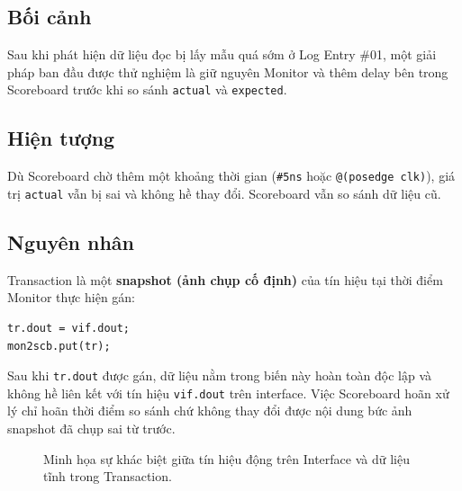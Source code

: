 \documentclass[12pt, a4paper]{article}
\begin{document}
\vspace{0.3cm}

\subsection*{Bối cảnh}
Sau khi phát hiện dữ liệu đọc bị lấy mẫu quá sớm ở Log Entry \#01, một giải pháp ban đầu được thử nghiệm là giữ nguyên Monitor và thêm delay bên trong Scoreboard trước khi so sánh \texttt{actual} và \texttt{expected}.

\subsection*{Hiện tượng}
Dù Scoreboard chờ thêm một khoảng thời gian (\texttt{\#5ns} hoặc \texttt{@(posedge clk)}), giá trị \texttt{actual} vẫn bị sai và không hề thay đổi. Scoreboard vẫn so sánh dữ liệu cũ.


\subsection*{Nguyên nhân}
Transaction là một \textbf{snapshot (ảnh chụp cố định)} của tín hiệu tại thời điểm Monitor thực hiện gán:
\begin{codebox}
\begin{verbatim}
tr.dout = vif.dout;
mon2scb.put(tr);
\end{verbatim}
\end{codebox}
Sau khi \texttt{tr.dout} được gán, dữ liệu nằm trong biến này hoàn toàn độc lập và không hề liên kết với tín hiệu \texttt{vif.dout} trên interface. Việc Scoreboard hoãn xử lý chỉ hoãn thời điểm so sánh chứ không thay đổi được nội dung bức ảnh snapshot đã chụp sai từ trước.

\begin{figure}[H]
\centering
{}
\caption{Minh họa sự khác biệt giữa tín hiệu động trên Interface và dữ liệu tĩnh trong Transaction.}
\label{fig:log03_b}
\end{figure}
\end{document}
